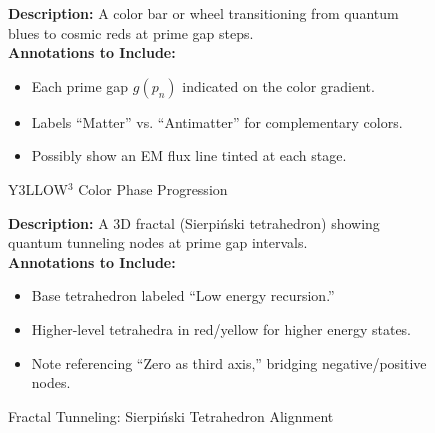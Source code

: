 \documentclass[11pt]{article}
\begin{document}
\begin{figure}[p]
\caption{Y3LLOW$^3$ Color Phase Progression}
\label{fig:colorPhases}
\textbf{Description:}  
A color bar or wheel transitioning from quantum blues to cosmic reds at prime gap steps.
\\[0.5em]
\textbf{Annotations to Include:}
\begin{itemize}
    \item Each prime gap $g(p_n)$ indicated on the color gradient.
    \item Labels “Matter” vs. “Antimatter” for complementary colors.
    \item Possibly show an EM flux line tinted at each stage.
\end{itemize}
\end{figure}

\begin{figure}[p]
\caption{Fractal Tunneling: Sierpi\'nski Tetrahedron Alignment}
\label{fig:fractalTunneling}
\textbf{Description:}  
A 3D fractal (Sierpi\'nski tetrahedron) showing quantum tunneling nodes at prime gap intervals.
\\[0.5em]
\textbf{Annotations to Include:}
\begin{itemize}
    \item Base tetrahedron labeled “Low energy recursion.”
    \item Higher-level tetrahedra in red/yellow for higher energy states.
    \item Note referencing “Zero as third axis,” bridging negative/positive nodes.
\end{itemize}
\end{figure}

\clearpage



\end{document}
